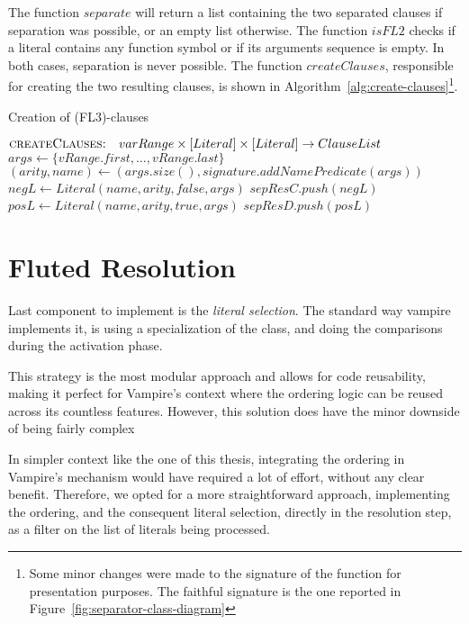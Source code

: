 The function \(separate\) will return a list containing the two separated clauses if separation was possible, or an empty list otherwise.
The function \(isFL2\) checks if a literal contains any function symbol or if its arguments sequence is empty. In both cases, separation is never possible.
The function \(createClauses\), responsible for creating the two resulting clauses, is shown in Algorithm~\ref{alg:create-clauses}\footnote{
  Some minor changes were made to the signature of the function for presentation purposes. The faithful signature is the one reported in Figure~\ref{fig:separator-class-diagram}
}.

\begin{algorithm}[H]
  \caption{Creation of (FL3)-clauses}\label{alg:create-clauses}
  \begin{algorithmic}[1]
    \Statex{}  \(\textsc{createClauses:}\quad varRange \times [Literal] \times [Literal] \to ClauseList\)
      \State{} \(args \gets \{vRange.first,\ldots,vRange.last\}\)
      \State{} \((arity,name) \gets(args.size(),signature.addNamePredicate(args))\)
      \State{} \(negL \gets Literal(name,arity,false,args)\)
      \State{} \(sepResC.push(negL)\)
      \State{} \(posL \gets Literal(name,arity,true,args)\)
      \State{} \(sepResD.push(posL)\)
      \State{} 
    \EndFunction{}
  \end{algorithmic}
\end{algorithm}

\section{Fluted Resolution}\label{sec:fluted-resolution-impl}

Last component to implement is the \emph{literal selection}.
The standard way vampire implements it, is using a specialization of the  class, and doing the comparisons during the activation phase.

This strategy is the most modular approach and allows for code reusability, making it perfect for Vampire's context where the ordering logic can be reused across its countless features.
However, this solution does have the minor downside of being fairly complex

In simpler context like the one of this thesis, integrating the ordering in Vampire's mechanism would have required a lot of effort, without any clear benefit.
Therefore, we opted for a more straightforward approach, implementing the ordering, and the consequent literal selection, directly in the resolution step, as a filter on the list of literals being processed.

